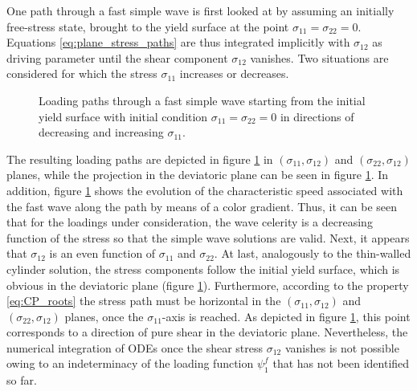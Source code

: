 One path through a fast simple wave is first looked at by assuming an initially free-stress state, brought to the yield surface at the point $ \sigma_{11}=\sigma_{22}=0 $.
Equations \eqref{eq:plane_stress_paths} are thus integrated implicitly with $\sigma_{12}$ as driving parameter until the shear component $\sigma_{12}$ vanishes.
Two situations are considered for which the stress $\sigma_{11}$ increases or decreases.
\begin{figure}[h!]
  \centering
  \caption{Loading paths through a fast simple wave starting from the initial yield surface with initial condition $\sigma_{11}=\sigma_{22}=0 $ in directions of decreasing and increasing $\sigma_{11} $.}
  \label{fig:fast_path_plane_stress}
\end{figure}
The resulting loading paths are depicted in figure \ref{fig:fast_path_plane_stress} in $(\sigma_{11},\sigma_{12})$ and $(\sigma_{22},\sigma_{12})$ planes, while the projection in the deviatoric plane can be seen in figure \ref{fig:fast_path_plane_stress}.
In addition, figure \ref{fig:fast_path_plane_stress} shows the evolution of the characteristic speed associated with the fast wave along the path by means of a color gradient.
Thus, it can be seen that for the loadings under consideration, the wave celerity is a decreasing function of the stress so that the simple wave solutions are valid.
Next, it appears that $\sigma_{12}$ is an even function of $\sigma_{11}$ and $\sigma_{22}$. %
At last, analogously to the thin-walled cylinder solution, the stress components follow the initial yield surface, which is obvious in the deviatoric plane (figure \ref{fig:fast_path_plane_stress}).
Furthermore, according to the property \eqref{eq:CP_roots} the stress path must be horizontal in the $(\sigma_{11},\sigma_{12})$ and $(\sigma_{22},\sigma_{12})$ planes, once the $\sigma_{11}$-axis is reached.
As depicted in figure \ref{fig:fast_path_plane_stress}, this point corresponds to a direction of pure shear in the deviatoric plane.
Nevertheless, the numerical integration of ODEs once the shear stress $\sigma_{12}$ vanishes is not possible owing to an indeterminacy of the loading function $\psi_1^f$ that has not been identified so far.

